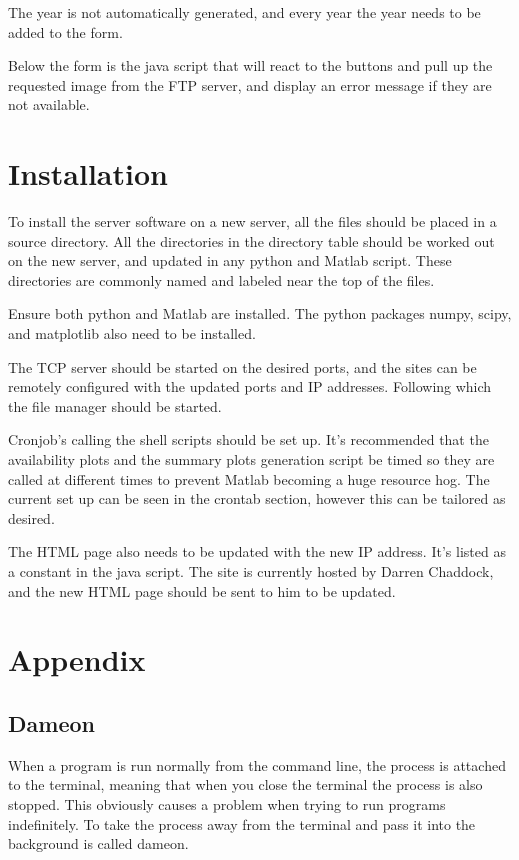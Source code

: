 \documentclass{article}
\begin{document}
The year is not automatically generated, and every year the year needs to be added to the form. 

Below the form is the java script that will react to the buttons and pull up the requested image from the FTP server, and display an error message if they are not available.


\section{Installation}

To install the server software on a new server, all the files should be placed in a source directory. All the directories in the directory table should be worked out on the new server, and updated in any python and Matlab script. These directories are commonly named and labeled near the top of the files.

Ensure both python and Matlab are installed. The python packages numpy, scipy, and matplotlib also need to be installed.

The TCP server should be started on the desired ports, and the sites can be remotely configured with the updated ports and IP addresses. Following which the file manager should be started.

Cronjob's calling the shell scripts should be set up. It's recommended that the availability plots and the summary plots generation script be timed so they are called at different times to prevent Matlab becoming a huge resource hog. The current set up can be seen in the crontab section, however this can be tailored as desired.

The HTML page also needs to be updated with the new IP address. It's listed as a constant in the java script. The site is currently hosted by Darren Chaddock, and the new HTML page should be sent to him to be updated. 


\section{Appendix}

\subsection{Dameon}

When a program is run normally from the command line, the process is attached to the terminal, meaning that when you close the terminal the process is also stopped. This obviously causes a problem when trying to run programs indefinitely. To take the process away from the terminal and pass it into the background is called dameon. 
\end{document}
